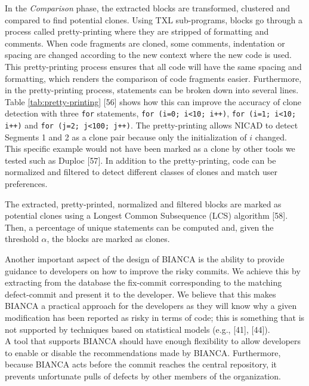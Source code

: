 \documentclass[conference]{IEEEtran}
\begin{document}
In the \emph{Comparison} phase, the extracted blocks are transformed,
clustered and compared to find potential clones. Using TXL sub-programs,
blocks go through a process called pretty-printing where they are
stripped of formatting and comments. When code fragments are cloned,
some comments, indentation or spacing are changed according to the new
context where the new code is used. This pretty-printing process ensures
that all code will have the same spacing and formatting, which renders
the comparison of code fragments easier. Furthermore, in the
pretty-printing process, statements can be broken down into several
lines. Table \ref{tab:pretty-printing} {[}56{]} shows how this can
improve the accuracy of clone detection with three \texttt{for}
statements, \texttt{for (i=0; i\textless{}10; i++)},
\texttt{for (i=1; i\textless{}10; i++)} and
\texttt{for (j=2; j\textless{}100; j++)}. The pretty-printing allows
NICAD to detect Segments 1 and 2 as a clone pair because only the
initialization of $i$ changed. This specific example would not have been
marked as a clone by other tools we tested such as Duploc {[}57{]}. In
addition to the pretty-printing, code can be normalized and filtered to
detect different classes of clones and match user preferences.



The extracted, pretty-printed, normalized and filtered blocks are marked
as potential clones using a Longest Common Subsequence (LCS) algorithm
{[}58{]}. Then, a percentage of unique statements can be computed and,
given the threshold $\alpha$, the blocks are marked as clones.

Another important aspect of the design of BIANCA is the ability to
provide guidance to developers on how to improve the risky commits. We
achieve this by extracting from the database the fix-commit
corresponding to the matching defect-commit and present it to the
developer. We believe that this makes BIANCA a practical approach for
the developers as they will know why a given modification has been
reported as risky in terms of code; this is something that is not
supported by techniques based on statistical models (e.g., {[}41{]},
{[}44{]}).\\A tool that supports BIANCA should have enough flexibility
to allow developers to enable or disable the recommendations made by
BIANCA. Furthermore, because BIANCA acts before the commit reaches the
central repository, it prevents unfortunate pulls of defects by other
members of the organization.
\end{document}
